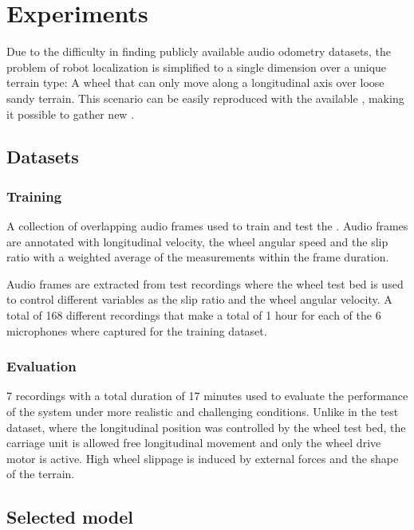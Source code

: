 \section{Experiments} \label{sec:experiments}

Due to the difficulty in finding publicly available audio odometry datasets,
the problem of robot localization is simplified to a single dimension over a
unique terrain type: A wheel that can only move along a longitudinal axis over
loose sandy terrain. This scenario can be easily reproduced with the available
, making it possible to gather new
. 



\subsection{Datasets} \label{subsec:datasets}

\subsubsection{Training} \label{subsubsec:training-dataset} A collection of
overlapping audio frames used to train and test the
. Audio frames are annotated with longitudinal
velocity, the wheel angular speed and the slip ratio with a weighted average of
the measurements within the frame duration.

Audio frames are extracted from test recordings where the wheel test bed is
used to control different variables as the slip ratio and the wheel angular
velocity. A total of 168 different recordings that make a total of 1 hour for
each of the 6 microphones where captured for the training dataset.  

\subsubsection{Evaluation} \label{subsubsec:evaluatio-dataset} 7 recordings
with a total duration of 17 minutes used to evaluate the performance of the
system under more realistic and challenging conditions. Unlike in the test
dataset, where the longitudinal position was controlled by the wheel test bed,
the carriage unit is allowed free longitudinal movement and only the wheel
drive motor is active. High wheel slippage is induced by external forces and
the shape of the terrain.


\subsection{Selected model} \label{subsec:selected-model} 

